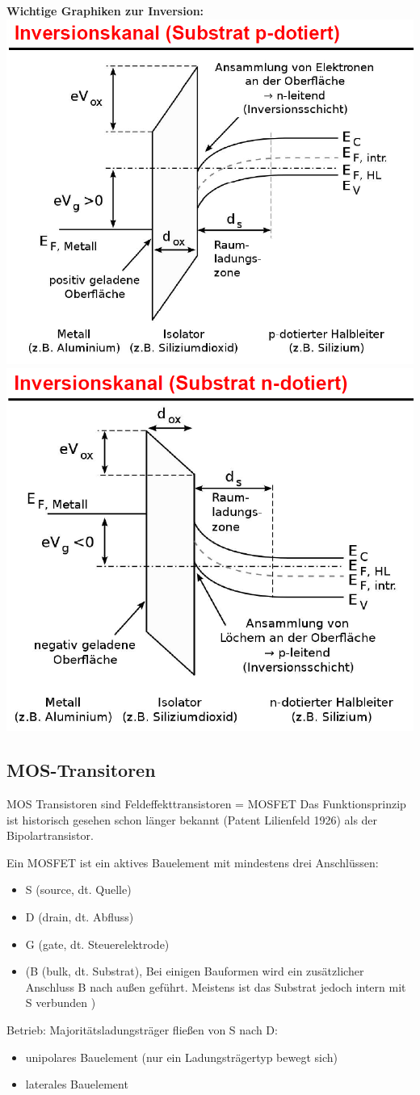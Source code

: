 		\textbf{Wichtige Graphiken zur Inversion:}
		\newline
		\includegraphics[width=0.5\linewidth]{Kapitel/Kap06/InversionPKanal}		\includegraphics[width=0.48\linewidth]{Kapitel/Kap06/InversionNKanal}
		
		
	\newpage	
\subsection{MOS-Transitoren}
	MOS Transistoren sind Feldeffekttransistoren =
	MOSFET
	\newline
	Das Funktionsprinzip ist historisch gesehen schon länger bekannt (Patent Lilienfeld 1926) als der Bipolartransistor.
	
		Ein MOSFET ist ein aktives Bauelement mit mindestens drei Anschlüssen:
	\begin{itemize}
		\item S (source, dt. Quelle)
		\item D (drain, dt. Abfluss)
		\item G (gate, dt. Steuerelektrode)
		\item (B (bulk, dt. Substrat), Bei einigen Bauformen wird ein zusätzlicher Anschluss B nach außen geführt. Meistens ist das 		Substrat jedoch intern mit S verbunden )
	\end{itemize}
	Betrieb: Majoritätsladungsträger fließen von S nach D:
	\begin{itemize}
		\item unipolares Bauelement (nur ein Ladungsträgertyp bewegt sich)
		\item laterales Bauelement
	\end{itemize}
	
